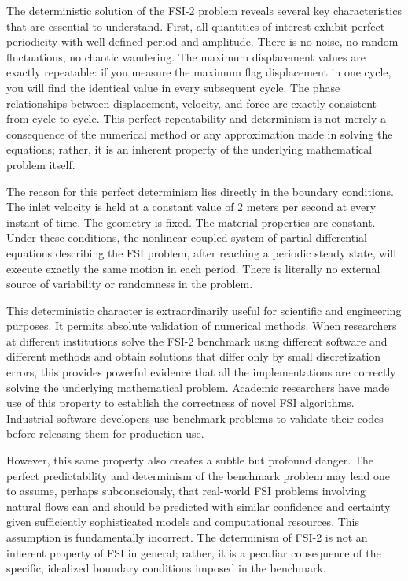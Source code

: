﻿\documentclass[a4paper,11pt]{article}
\theoremstyle{definition}
\begin{document}
The deterministic solution of the FSI-2 problem reveals several key characteristics that are essential to understand. First, all quantities of interest exhibit perfect periodicity with well-defined period and amplitude. There is no noise, no random fluctuations, no chaotic wandering. The maximum displacement values are exactly repeatable: if you measure the maximum flag displacement in one cycle, you will find the identical value in every subsequent cycle. The phase relationships between displacement, velocity, and force are exactly consistent from cycle to cycle. This perfect repeatability and determinism is not merely a consequence of the numerical method or any approximation made in solving the equations; rather, it is an inherent property of the underlying mathematical problem itself.

The reason for this perfect determinism lies directly in the boundary conditions. The inlet velocity is held at a constant value of 2 meters per second at every instant of time. The geometry is fixed. The material properties are constant. Under these conditions, the nonlinear coupled system of partial differential equations describing the FSI problem, after reaching a periodic steady state, will execute exactly the same motion in each period. There is literally no external source of variability or randomness in the problem.

This deterministic character is extraordinarily useful for scientific and engineering purposes. It permits absolute validation of numerical methods. When researchers at different institutions solve the FSI-2 benchmark using different software and different methods and obtain solutions that differ only by small discretization errors, this provides powerful evidence that all the implementations are correctly solving the underlying mathematical problem. Academic researchers have made use of this property to establish the correctness of novel FSI algorithms. Industrial software developers use benchmark problems to validate their codes before releasing them for production use.

However, this same property also creates a subtle but profound danger. The perfect predictability and determinism of the benchmark problem may lead one to assume, perhaps subconsciously, that real-world FSI problems involving natural flows can and should be predicted with similar confidence and certainty given sufficiently sophisticated models and computational resources. This assumption is fundamentally incorrect. The determinism of FSI-2 is not an inherent property of FSI in general; rather, it is a peculiar consequence of the specific, idealized boundary conditions imposed in the benchmark.
\end{document}
